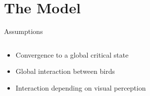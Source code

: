 \documentclass{beamer}
\begin{document}
\section{The Model}
\begin{frame}{Assumptions}
	\begin{minipage}[0.95\textheight]{\textwidth}
	\begin{columns}[T]
	\begin{column}{0.40\textwidth}
		\begin{itemize}
		\item Convergence to a global critical state
		\vspace{0.5cm}
		\item Global interaction between birds
		\vspace{0.5cm}
		\item Interaction depending on visual perception
		\end{itemize}
	\end{column}
	\begin{column}{0.50\textwidth}
		\begin{center}
		\end{center}
	\end{column}
	\end{columns}
	\end{minipage}
\end{frame}
\end{document}
